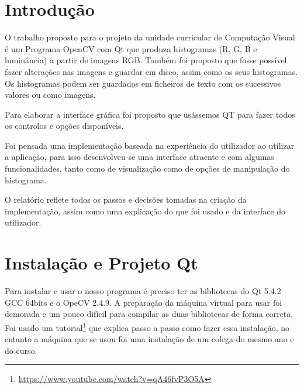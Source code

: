 \documentclass[pdftex,12pt,a4paper]{report}
\begin{document}
\renewcommand{\headrulewidth}{0pt}

\fancyhead{}
\fancyfoot{}
\rfoot{\thepage}

\renewcommand*\contentsname{Conteúdos}
\renewcommand*\figurename{Figura}
\renewcommand*\tablename{Tabela}

\tableofcontents
\renewcommand{\headrulewidth}{0.15pt}
\renewcommand{\thechapter}{}

\clearpage

\section{Introdução}
O trabalho proposto para o projeto da unidade curricular de Computação Visual é um Programa OpenCV com Qt que produza histogramas (R, G, B e luminância) a partir de imagens RGB. Também foi proposto que fosse possível fazer alterações nas imagens e guardar em disco, assim como os seus histogramas. Os histogramas podem ser guardados em ficheiros de texto com os sucessivos valores ou como imagens.

Para elaborar a interface gráfica foi proposto que usássemos QT para fazer todos os controlos e opções disponíveis.

Foi pensada uma implementação baseada na experiência do utilizador ao utilizar a aplicação, para isso desenvolveu-se uma interface atraente e com algumas funcionalidades, tanto como de visualização como de opções de manipulação do histograma.  

O relatório reflete todos os passos e decisões tomadas na criação da implementação, assim como uma explicação do que foi usado e da interface do utilizador.

\clearpage

\section{Instalação e Projeto Qt}

Para instalar e usar o nosso programa é preciso ter as bibliotecas do Qt 5.4.2 GCC 64bits e o OpeCV 2.4.9. A preparação da máquina virtual para usar foi demorada e um pouco difícil para compilar as duas bibliotecas de forma correta. Foi usado um tutorial\footnote{\label{url1} \url{https://www.youtube.com/watch?v=qA46fvP3O5A}} que explica passo a passo como fazer essa instalação, no entanto a máquina que se usou foi uma instalação de um colega do mesmo ano e do curso.
\end{document}
